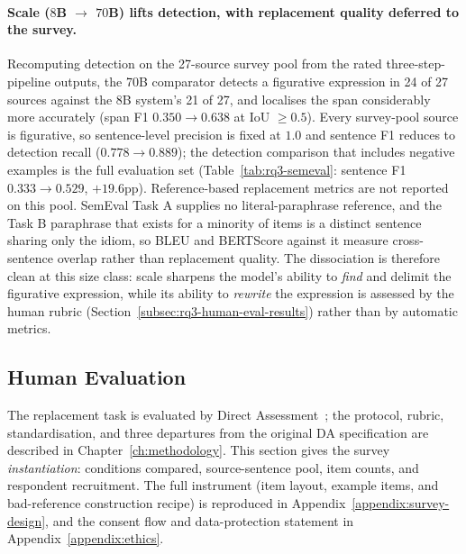 \paragraph{Scale ($8$B $\to$ $70$B) lifts detection, with replacement quality deferred to the survey.} Recomputing detection on the 27-source survey pool from the rated three-step-pipeline outputs, the 70B comparator detects a figurative expression in 24 of 27 sources against the 8B system's 21 of 27, and localises the span considerably more accurately (span F1 $0.350 \to 0.638$ at IoU $\geq 0.5$). Every survey-pool source is figurative, so sentence-level precision is fixed at $1.0$ and sentence F1 reduces to detection recall ($0.778 \to 0.889$); the detection comparison that includes negative examples is the full evaluation set (Table~\ref{tab:rq3-semeval}: sentence F1 $0.333 \to 0.529$, $+19.6$pp). Reference-based replacement metrics are not reported on this pool. SemEval Task A supplies no literal-paraphrase reference, and the Task B paraphrase that exists for a minority of items is a distinct sentence sharing only the idiom, so BLEU and BERTScore against it measure cross-sentence overlap rather than replacement quality. The dissociation is therefore clean at this size class: scale sharpens the model's ability to \emph{find} and delimit the figurative expression, while its ability to \emph{rewrite} the expression is assessed by the human rubric (Section~\ref{subsec:rq3-human-eval-results}) rather than by automatic metrics.

\subsection{Human Evaluation}
\label{subsec:rq3-human-eval}

The replacement task is evaluated by Direct Assessment~\cite{Graham2013,Graham2017}; the protocol, rubric, standardisation, and three departures from the original DA specification are described in Chapter~\ref{ch:methodology}. This section gives the survey \textit{instantiation}: conditions compared, source-sentence pool, item counts, and respondent recruitment. The full instrument (item layout, example items, and bad-reference construction recipe) is reproduced in Appendix~\ref{appendix:survey-design}, and the consent flow and data-protection statement in Appendix~\ref{appendix:ethics}.

